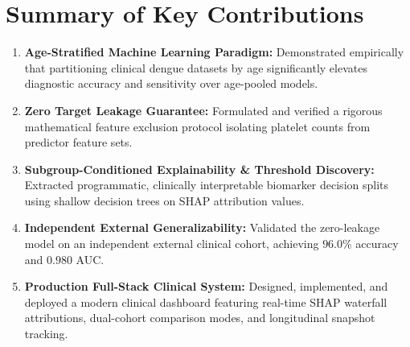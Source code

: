 \documentclass[12pt, a4paper]{report}
\begin{document}
\section{Summary of Key Contributions}
\begin{enumerate}
    \item \textbf{Age-Stratified Machine Learning Paradigm:} Demonstrated empirically that partitioning clinical dengue datasets by age significantly elevates diagnostic accuracy and sensitivity over age-pooled models.
    \item \textbf{Zero Target Leakage Guarantee:} Formulated and verified a rigorous mathematical feature exclusion protocol isolating platelet counts from predictor feature sets.
    \item \textbf{Subgroup-Conditioned Explainability \& Threshold Discovery:} Extracted programmatic, clinically interpretable biomarker decision splits using shallow decision trees on SHAP attribution values.
    \item \textbf{Independent External Generalizability:} Validated the zero-leakage model on an independent external clinical cohort, achieving $96.0\%$ accuracy and $0.980$ AUC.
    \item \textbf{Production Full-Stack Clinical System:} Designed, implemented, and deployed a modern clinical dashboard featuring real-time SHAP waterfall attributions, dual-cohort comparison modes, and longitudinal snapshot tracking.
\end{enumerate}
\end{document}
